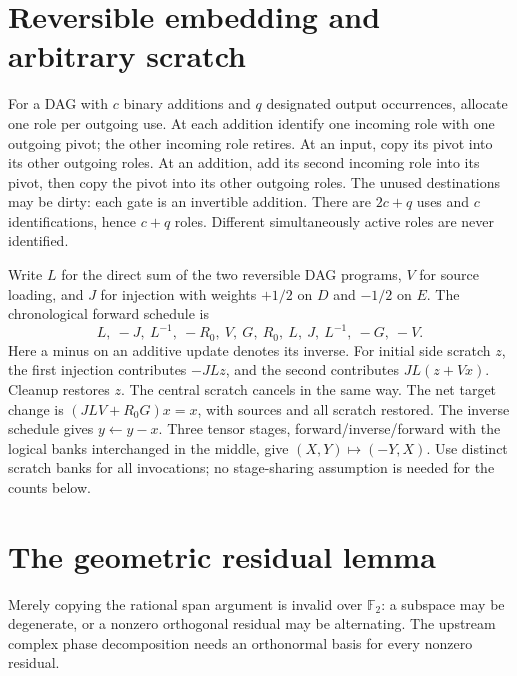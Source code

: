 \documentclass[11pt]{article}
\newcommand{\FF}{\mathbb F_2}
\begin{document}
\section{Reversible embedding and arbitrary scratch}
For a DAG with $c$ binary additions and $q$ designated output occurrences,
allocate one role per outgoing use. At each addition identify one incoming
role with one outgoing pivot; the other incoming role retires. At an input,
copy its pivot into its other outgoing roles. At an addition, add its second
incoming role into its pivot, then copy the pivot into its other outgoing
roles. The unused destinations may be dirty: each gate is an invertible
addition. There are $2c+q$ uses and $c$ identifications, hence $c+q$ roles.
Different simultaneously active roles are never identified.

Write $L$ for the direct sum of the two reversible DAG programs, $V$ for
source loading, and $J$ for injection with weights $+1/2$ on $D$ and $-1/2$
on $E$. The chronological forward schedule is
\[
 L,\ -J,\ L^{-1},\ -R_0,\ V,\ G,\ R_0,\ L,\ J,\ L^{-1},\ -G,\ -V.
\]
Here a minus on an additive update denotes its inverse. For initial side
scratch $z$, the first injection contributes $-JLz$, and the second
contributes $JL(z+Vx)$. Cleanup restores $z$. The central scratch cancels
in the same way. The net target change is
$(JLV+R_0G)x=x$, with sources and all scratch restored. The inverse schedule
gives $y\gets y-x$. Three tensor stages, forward/inverse/forward with the
logical banks interchanged in the middle, give $(X,Y)\mapsto(-Y,X)$.
Use distinct scratch banks for all invocations; no stage-sharing assumption
is needed for the counts below.

\section{The geometric residual lemma}
Merely copying the rational span argument is invalid over $\FF$: a subspace
may be degenerate, or a nonzero orthogonal residual may be alternating.
The upstream complex phase decomposition needs an orthonormal basis for
every nonzero residual.
\end{document}
